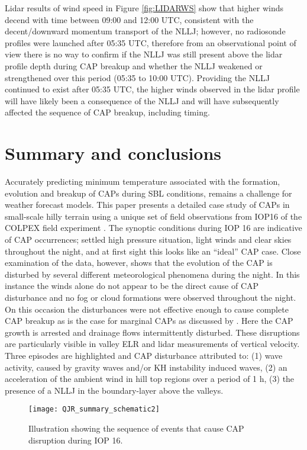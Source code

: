 \documentclass[times]{qjrms4}
\begin{document}
Lidar results of wind speed in Figure \ref{fig:LIDARWS} show that higher winds decend with time between 09:00 and 12:00 UTC, consistent with the decent/downward momentum transport of the NLLJ; however, no radiosonde profiles were launched after 05:35 UTC, therefore from an observational point of view there is no way to confirm if the NLLJ was still present above the lidar profile depth during CAP breakup and whether the NLLJ weakened or strengthened over this period (05:35 to 10:00 UTC). Providing the NLLJ continued to exist after 05:35 UTC, the higher winds observed in the lidar profile will have likely been a consequence of the NLLJ and will have subsequently affected the sequence of CAP breakup, including timing.

\section{Summary and conclusions}
\label{summary}
Accurately predicting minimum temperature associated with the formation, evolution and breakup of CAPs during SBL conditions, remains a challenge for weather forecast models. This paper presents a detailed case study of CAPs in small-scale hilly terrain using a unique set of field observations from IOP16 of the COLPEX field experiment \citep{price2010COLPEX}. The synoptic conditions during IOP 16 are indicative of CAP occurrences; settled high pressure situation, light winds and clear skies throughout the night, and at first sight this looks like an ``ideal'' CAP case. Close examination of the data, however, shows that the evolution of the CAP is disturbed by several different meteorological phenomena during the night. In this instance the winds alone do not appear to be the direct cause of CAP disturbance and no fog or cloud formations were observed throughout the night. On this occasion the disturbances were not effective enough to cause complete CAP breakup as is the case for marginal CAPs as discussed by \citep{mahrt2015common}. Here the CAP growth is arrested and drainage flows intermittently disturbed. These disruptions are particularly visible in valley ELR and lidar measurements of vertical velocity. Three episodes are highlighted and CAP disturbance attributed to: (1) wave activity, caused by gravity waves and/or KH instability induced waves, (2) an acceleration of the ambient wind in hill top regions over a period of 1 h, (3) the presence of a NLLJ in the boundary-layer above the valleys.
       \begin{figure*}
        \centering
        \texttt{[image: QJR\_summary\_schematic2]}
        \caption{Illustration showing the sequence of events that cause CAP disruption during IOP 16.}
        \label{fig:schematic}
        \end{figure*}
\end{document}
